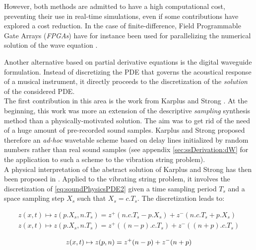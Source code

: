 {{However, both methods are admitted to have a high computational cost, preventing their use in real-time simulations, even if some contributions have explored a cost reduction. In the case of finite-difference, Field Programmable Gate Arrays (\emph{FPGAs}) have for instance been used for parallelizing the numerical solution of the wave equation . %


					\label{subsubsubsubsec:CM_SS_Physics_Wave_Waveguide}

Another alternative based on partial derivative equations is the digital waveguide formulation. Instead of discretizing the PDE that governs the acoustical response of a musical instrument, it directly proceeds to the discretization of the \emph{solution} of the considered PDE.\\

The first contribution in this area is the work from Karplus and Strong . At the beginning, this work was more an extension of the descriptive \emph{sampling} synthesis method than a physically-motivated solution. The aim was to get rid of the need of a huge amount of pre-recorded sound samples. Karplus and Strong proposed therefore an \emph{ad-hoc} wavetable scheme based on delay lines initialized by random numbers rather than real sound samples (see appendix \ref{sec:ssDerivation:dW} for the application to such a scheme to the vibration string problem).\\

A physical interpretation of the abstract solution of Karplus and Strong has then been proposed in . Applied to the vibrating string problem, it involves the discretization of \myequname \eqref{eq:soundPhysicsPDE2} given a time sampling period $T_s$ and a space sampling step $X_s$ such that $X_s = c.T_s$. The discretization leads to:

$$
\begin{array}{l}
	z(x, t) \mapsto z(p.X_s, n.T_s) = z^{+}(n.c.T_s - p.X_s) + z^{-}(n.c.T_s + p.X_s) \nonumber \\
	z(x, t) \mapsto z(p.X_s, n.T_s) = z^{+}((n-p).c.T_s) + z^{-}((n+p).c.T_s) \nonumber
\end{array}
$$

\begin{equation}
	z(x, t) \mapsto z(p, n) = z^{+}(n-p) + z^{-}(n+p)
	\label{eq:soundPhysicsDW}
	\eqcaption{Digital waveguide formulation}
\end{equation}

}}
